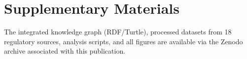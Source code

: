 \section*{Supplementary Materials}
\label{sec:supplementary_materials}
The integrated knowledge graph (RDF/Turtle), processed datasets from 18 regulatory sources, analysis scripts, and all figures are available via the Zenodo archive associated with this publication.